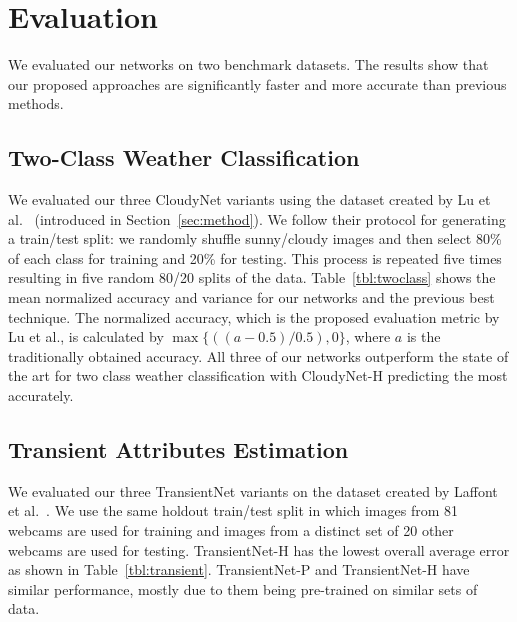 \documentclass[10pt,twocolumn,letterpaper]{article}
\newcommand{\tblref}[1]{Table~\ref{tbl:#1}}
\begin{document}
\section{Evaluation}

We evaluated our networks on two benchmark datasets. The results show
that our proposed approaches are significantly faster and more
accurate than previous methods. 

\subsection{Two-Class Weather Classification}

We evaluated our three CloudyNet variants using the dataset created by Lu et
al.~\cite{lutwoclass} (introduced in Section~\ref{sec:method}). 
We follow their protocol for
generating a train/test split: we randomly shuffle sunny/cloudy images
and then select 80\% of each class for training and 20\% for testing.
This process is repeated five times resulting in five random 80/20
splits of the data. 
\tblref{twoclass} shows the mean normalized accuracy and variance for our
networks and the previous best technique.  The normalized accuracy, which is
the proposed evaluation metric by Lu et al., is calculated by $ \max\{((a -
0.5) / 0.5), 0\} $, where $a$ is the traditionally obtained accuracy. All three
of our networks outperform the state of the art for two class weather
classification with CloudyNet-H predicting the most accurately.


\subsection{Transient Attributes Estimation}

We evaluated our three TransientNet variants on the dataset created by Laffont
et al.~\cite{Laffont14}.  We use the same holdout train/test split in which
images from 81 webcams are used for training and images from a distinct set of
20 other webcams are used for testing. 
TransientNet-H has the lowest overall average error as shown in
\tblref{transient}.  TransientNet-P and TransientNet-H have similar
performance, mostly due to them being pre-trained on similar sets of data.
\end{document}
